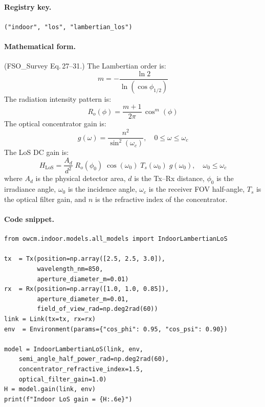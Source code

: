 \documentclass[11pt,a4paper]{article}
\begin{document}
\paragraph{Registry key.} \texttt{("indoor", "los", "lambertian\_los")}

\paragraph{Mathematical form.}
(FSO\_Survey Eq.\,27--31.)  The Lambertian order is:
\begin{equation}
m = -\frac{\ln 2}{\ln(\cos \phi_{1/2})}
\end{equation}
The radiation intensity pattern is:
\begin{equation}
R_o(\phi) = \frac{m+1}{2\pi}\,\cos^m(\phi)
\end{equation}
The optical concentrator gain is:
\begin{equation}
g(\omega) = \frac{n^2}{\sin^2(\omega_c)}, \quad 0 \le \omega \le \omega_c
\end{equation}
The LoS DC gain is:
\begin{equation}
\boxed{H_{\text{LoS}} = \frac{A_d}{d^2}\;R_o(\phi_0)\;\cos(\omega_0)\;T_s(\omega_0)\;g(\omega_0),
\quad \omega_0 \le \omega_c}
\end{equation}
where $A_d$ is the physical detector area, $d$ is the Tx--Rx distance,
$\phi_0$ is the irradiance angle, $\omega_0$ is the incidence angle,
$\omega_c$ is the receiver FOV half-angle, $T_s$ is the optical filter gain,
and $n$ is the refractive index of the concentrator.

\paragraph{Code snippet.}
\begin{lstlisting}
from owcm.indoor.models.all_models import IndoorLambertianLoS

tx  = Tx(position=np.array([2.5, 2.5, 3.0]),
         wavelength_nm=850,
         aperture_diameter_m=0.01)
rx  = Rx(position=np.array([1.0, 1.0, 0.85]),
         aperture_diameter_m=0.01,
         field_of_view_rad=np.deg2rad(60))
link = Link(tx=tx, rx=rx)
env  = Environment(params={"cos_phi": 0.95, "cos_psi": 0.90})

model = IndoorLambertianLoS(link, env,
    semi_angle_half_power_rad=np.deg2rad(60),
    concentrator_refractive_index=1.5,
    optical_filter_gain=1.0)
H = model.gain(link, env)
print(f"Indoor LoS gain = {H:.6e}")
\end{lstlisting}
\end{document}
